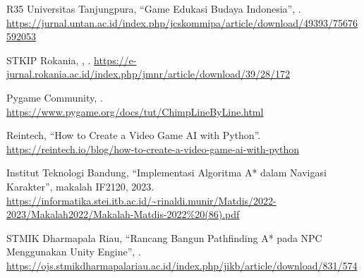 \begin{sloppypar}
\begin{thebibliography}{R35}
  Universitas Tanjungpura, ``Game Edukasi Budaya Indonesia'',
  .
  \url{https://jurnal.untan.ac.id/index.php/jcskommipa/article/download/49393/75676592053}

  STKIP Rokania, ,
  .
  \url{https://e-jurnal.rokania.ac.id/index.php/jmnr/article/download/39/28/172}

  Pygame Community, .
  \url{https://www.pygame.org/docs/tut/ChimpLineByLine.html}

  Reintech, ``How to Create a Video Game AI with Python''.
  \url{https://reintech.io/blog/how-to-create-a-video-game-ai-with-python}

  Institut Teknologi Bandung, ``Implementasi Algoritma A* dalam Navigasi
  Karakter'', makalah IF2120, 2023.
  \url{https://informatika.stei.itb.ac.id/~rinaldi.munir/Matdis/2022-2023/Makalah2022/Makalah-Matdis-2022%20(86).pdf}

  STMIK Dharmapala Riau, ``Rancang Bangun Pathfinding A* pada NPC
  Menggunakan Unity Engine'', .
  \url{https://ojs.stmikdharmapalariau.ac.id/index.php/jikb/article/download/831/574}

\end{thebibliography}
\end{sloppypar}
